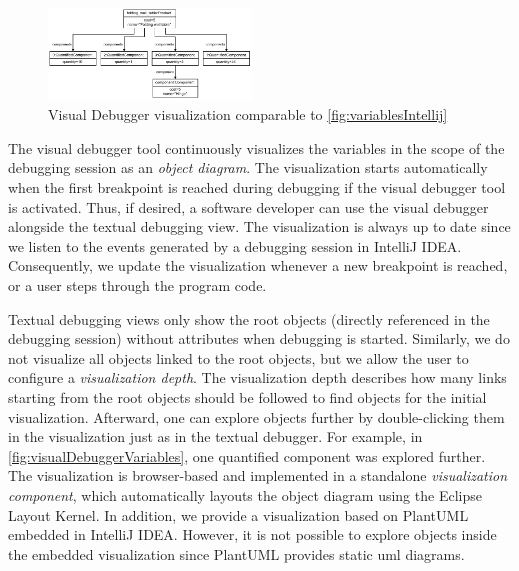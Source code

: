 \documentclass[conference]{IEEEtran}
\newcommand{\intellij}{IntelliJ IDEA}
\begin{document}
\begin{figure}[h]
    \centering
    \includegraphics[width=0.48\textwidth]{images/VD-parts list object diagram.pdf}
    \caption{Visual Debugger visualization comparable to \autoref{fig:variablesIntellij}}
    \label{fig:visualDebuggerVariables}
\end{figure}

The visual debugger tool continuously visualizes the variables in the scope of the debugging session as an \textit{object diagram}.
The visualization starts automatically when the first breakpoint is reached during debugging if the visual debugger tool is activated.
Thus, if desired, a software developer can use the visual debugger alongside the textual debugging view.
The visualization is always up to date since we listen to the events generated by a debugging session in \intellij{}.
Consequently, we update the visualization whenever a new breakpoint is reached, or a user steps through the program code.

Textual debugging views only show the root objects (directly referenced in the debugging session) without attributes when debugging is started.
Similarly, we do not visualize all objects linked to the root objects, but we allow the user to configure a \textit{visualization depth}.
The visualization depth describes how many links starting from the root objects should be followed to find objects for the initial visualization.
Afterward, one can explore objects further by double-clicking them in the visualization just as in the textual debugger.
For example, in \autoref{fig:visualDebuggerVariables}, one quantified component was explored further.
The visualization is browser-based and implemented in a standalone \textit{visualization component}, which automatically layouts the object diagram using the Eclipse Layout Kernel.
In addition, we provide a visualization based on PlantUML embedded in \intellij{}.
However, it is not possible to explore objects inside the embedded visualization since PlantUML provides static \gls*{uml} diagrams.
\end{document}
